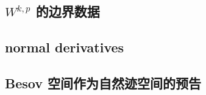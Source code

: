 

\subsection{\texorpdfstring{\(W^{k,p}\)}{Wk,p} 的边界数据}
\label{b1:subsec:230401}

\subsection{normal derivatives}
\label{b1:subsec:230402}

\subsection{Besov 空间作为自然迹空间的预告}
\label{b1:subsec:230403}


